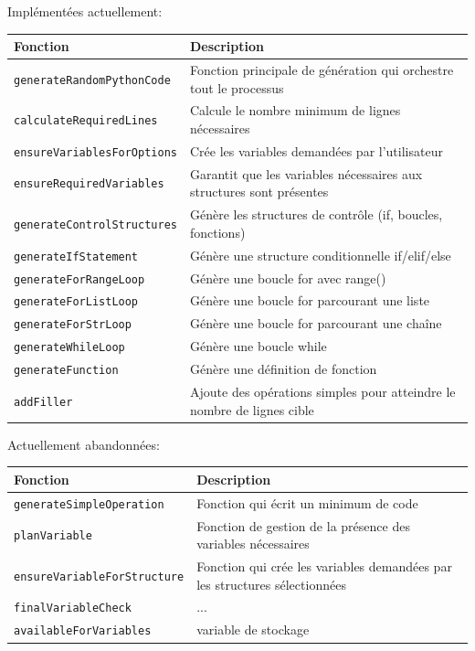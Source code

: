 \documentclass[11pt,a4paper]{article}
\begin{document}
Implémentées actuellement:
\begin{longtable}{p{5cm}p{10cm}}
\toprule
\textbf{Fonction} & \textbf{Description} \\
\midrule
\texttt{generateRandomPythonCode} & Fonction principale de génération qui orchestre tout le processus \\
\texttt{calculateRequiredLines} & Calcule le nombre minimum de lignes nécessaires \\
\texttt{ensureVariablesForOptions} & Crée les variables demandées par l'utilisateur \\
\texttt{ensureRequiredVariables} & Garantit que les variables nécessaires aux structures sont présentes \\
\texttt{generateControlStructures} & Génère les structures de contrôle (if, boucles, fonctions) \\
\texttt{generateIfStatement} & Génère une structure conditionnelle if/elif/else \\
\texttt{generateForRangeLoop} & Génère une boucle for avec range() \\
\texttt{generateForListLoop} & Génère une boucle for parcourant une liste \\
\texttt{generateForStrLoop} & Génère une boucle for parcourant une chaîne \\
\texttt{generateWhileLoop} & Génère une boucle while \\
\texttt{generateFunction} & Génère une définition de fonction \\
\texttt{addFiller} & Ajoute des opérations simples pour atteindre le nombre de lignes cible \\
\bottomrule
\end{longtable}

Actuellement abandonnées:
\begin{longtable}{p{5cm}p{10cm}}
\toprule
\textbf{Fonction} & \textbf{Description} \\
\midrule
\texttt{generateSimpleOperation} & Fonction qui écrit un minimum de code \\
\texttt{planVariable} & Fonction de gestion de la présence des variables nécessaires \\
\texttt{ensureVariableForStructure} & Fonction qui crée les variables demandées par les structures sélectionnées \\
\texttt{finalVariableCheck} & ... \\
\texttt{availableForVariables} & variable de stockage  \\
\bottomrule
\end{longtable}
\end{document}
